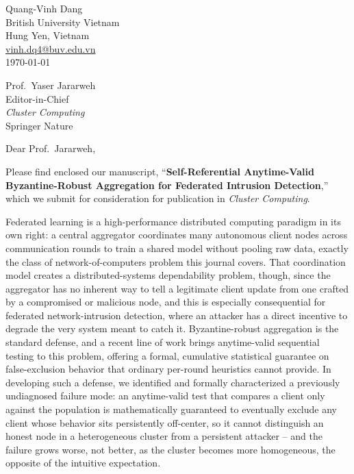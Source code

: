\documentclass[10.5pt]{article}
\begin{document}
\begin{flushright}
Quang-Vinh Dang\\
British University Vietnam\\
Hung Yen, Vietnam\\
\href{mailto:vinh.dq4@buv.edu.vn}{vinh.dq4@buv.edu.vn}\\
\today
\end{flushright}

\vspace{0.35cm}
\noindent Prof.\ Yaser Jararweh\\
Editor-in-Chief\\
\textit{Cluster Computing}\\
Springer Nature

\vspace{0.35cm}
\noindent Dear Prof.\ Jararweh,

\vspace{0.2cm}
\noindent Please find enclosed our manuscript, ``\textbf{Self-Referential Anytime-Valid Byzantine-Robust Aggregation for Federated Intrusion Detection},'' which we submit for consideration for publication in \textit{Cluster Computing}.

Federated learning is a high-performance distributed computing paradigm in its own right: a central aggregator coordinates many autonomous client nodes across communication rounds to train a shared model without pooling raw data, exactly the class of network-of-computers problem this journal covers. That coordination model creates a distributed-systems dependability problem, though, since the aggregator has no inherent way to tell a legitimate client update from one crafted by a compromised or malicious node, and this is especially consequential for federated network-intrusion detection, where an attacker has a direct incentive to degrade the very system meant to catch it. Byzantine-robust aggregation is the standard defense, and a recent line of work brings anytime-valid sequential testing to this problem, offering a formal, cumulative statistical guarantee on false-exclusion behavior that ordinary per-round heuristics cannot provide. In developing such a defense, we identified and formally characterized a previously undiagnosed failure mode: an anytime-valid test that compares a client only against the population is mathematically guaranteed to eventually exclude any client whose behavior sits persistently off-center, so it cannot distinguish an honest node in a heterogeneous cluster from a persistent attacker -- and the failure grows worse, not better, as the cluster becomes more homogeneous, the opposite of the intuitive expectation.
\end{document}
